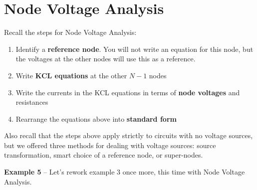 \documentclass{handout}
\begin{document}
\newpage
\clearpage
\pagebreak

\section{Node Voltage Analysis}
Recall the steps for Node Voltage Analysis:
\begin{enumerate}
\item Identify a \textbf{reference node}.  You will not write an equation for this node, but the voltages at the other nodes will use this as a reference.
\item Write \textbf{KCL equations} at the other $N-1$ nodes
\item Write the currents in the KCL equations in terms of \textbf{node voltages} and resistances
\item Rearrange the equations above into \textbf{standard form}
\end{enumerate}

Also recall that the steps above apply strictly to circuits with no voltage sources, but we offered three methods for dealing with voltage sources: source transformation, smart choice of a reference node, or super-nodes.

\textbf{Example 5} -- Let's rework example 3 once more, this time with Node Voltage Analysis.






\newpage
\clearpage
\pagebreak

\newpage
\clearpage
\pagebreak

\newpage
\clearpage
\pagebreak

\newpage
\clearpage
\pagebreak

\newpage
\clearpage
\pagebreak

\newpage
\clearpage
\pagebreak
\end{document}
